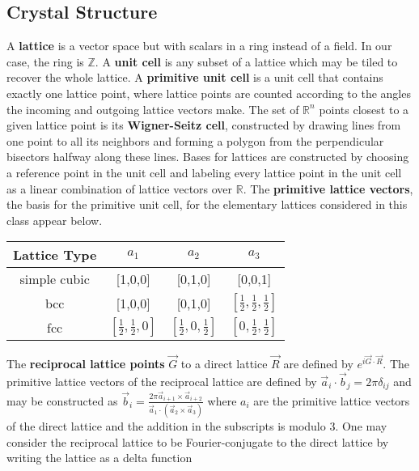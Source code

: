 \documentclass[10pt]{article}
\begin{document}
\begin{tiny}


\section*{Crystal Structure}
A \textbf{lattice} is a vector space but with scalars in a ring instead of a field.
In our case, the ring is $\mathbb{Z}$. A \textbf{unit cell} is any subset of a lattice which may be tiled to recover the whole lattice.
A \textbf{primitive unit cell} is a unit cell that contains exactly one lattice point,
where lattice points are counted according to the angles the incoming and outgoing lattice vectors make.
The set of $\mathbb{R}^n$ points closest to a given lattice point is its \textbf{Wigner-Seitz cell},
constructed by drawing lines from one point to all its neighbors and forming a polygon from the perpendicular bisectors halfway along these lines.
Bases for lattices are constructed by choosing a reference point in the unit cell and labeling every lattice point in the unit cell as a linear combination of lattice vectors over $\mathbb{R}$.
The \textbf{primitive lattice vectors}, the basis for the primitive unit cell, for the elementary lattices considered in this class appear below.
\begin{center}
  \begin{tabular}{ |c|c|c|c| }
    \hline
    Lattice Type & $a_{1}$ & $a_{2}$ & $a_{3}$ \\
    \hline
    \hline
    simple cubic & [1,0,0] & [0,1,0] & [0,0,1] \\
    \hline
    bcc & [1,0,0] & [0,1,0] & $[\frac{1}{2},\frac{1}{2},\frac{1}{2}]$ \\
    \hline
    fcc & $[\frac{1}{2},\frac{1}{2},0]$ & $[\frac{1}{2},0,\frac{1}{2}]$ & $[0,\frac{1}{2},\frac{1}{2}]$ \\
    \hline
  \end{tabular}
\end{center}
The \textbf{reciprocal lattice points} $\vec{G}$ to a direct lattice $\vec{R}$ are defined by
$e^{i\vec{G}\cdot\vec{R}}$.
The primitive lattice vectors of the reciprocal lattice are defined by $\vec{a}_{i}\cdot\vec{b}_{j}=2\pi\delta_{ij}$
and may be constructed as
$\vec{b}_{i}=\frac{2\pi \vec{a}_{i+1}\times\vec{a}_{i+2}}{\vec{a}_{1}\cdot(\vec{a}_{2}\times\vec{a}_{3})}$
where $a_{i}$ are the primitive lattice vectors of the direct lattice and the addition in the subscripts is modulo 3.
One may consider the reciprocal lattice to be Fourier-conjugate to the direct lattice by writing the lattice as a delta function

\end{tiny}
\end{document}
